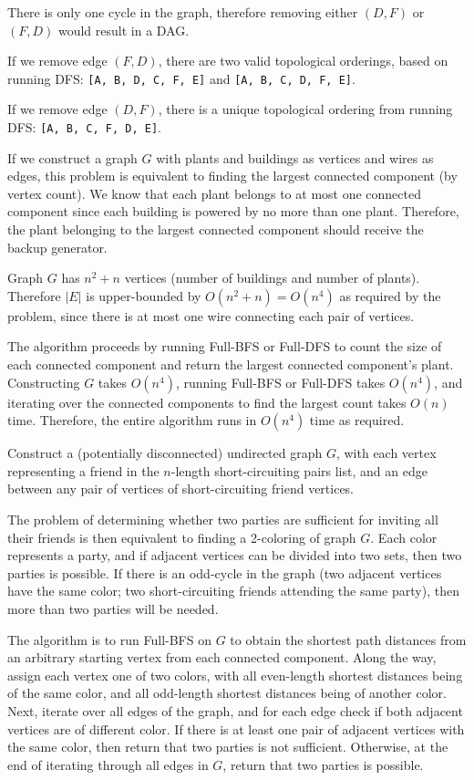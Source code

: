 \documentclass[12pt,twoside]{article}
\begin{document}
\begin{problems}
\begin{problemparts}
\problempart %
There is only one cycle in the graph, therefore removing either $(D, F)$ or $(F, D)$ would result in a DAG.

If we remove edge $(F, D)$, there are two valid topological orderings, based on running DFS: \verb|[A, B, D, C, F, E]| and \verb|[A, B, C, D, F, E]|.

If we remove edge $(D, F)$, there is a unique topological ordering from running DFS: \verb|[A, B, C, F, D, E]|.

\end{problemparts}

\newpage
\problem  %
If we construct a graph $G$ with plants and buildings as vertices and wires as edges, this problem is equivalent to finding the largest connected component (by vertex count). We know that each plant belongs to at most one connected component since each building is powered by no more than one plant. Therefore, the plant belonging to the largest connected component should receive the backup generator.

Graph $G$ has $n^2 + n$ vertices (number of buildings and number of plants). Therefore $|E|$ is upper-bounded by $O(n^2+n)=O(n^4)$ as required by the problem, since there is at most one wire connecting each pair of vertices.

The algorithm proceeds by running Full-BFS or Full-DFS to count the size of each connected component and return the largest connected component's plant. Constructing $G$ takes $O(n^4)$, running Full-BFS or Full-DFS takes $O(n^4)$, and iterating over the connected components to find the largest count takes $O(n)$ time. Therefore, the entire algorithm runs in $O(n^4)$ time as required.

\newpage
\problem  %
Construct a (potentially disconnected) undirected graph $G$, with each vertex representing a friend in the $n$-length short-circuiting pairs list, and an edge between any pair of vertices of short-circuiting friend vertices.

The problem of determining whether two parties are sufficient for inviting all their friends is then equivalent to finding a 2-coloring of graph $G$. Each color represents a party, and if adjacent vertices can be divided into two sets, then two parties is possible. If there is an odd-cycle in the graph (two adjacent vertices have the same color; two short-circuiting friends attending the same party), then more than two parties will be needed.

The algorithm is to run Full-BFS on $G$ to obtain the shortest path distances from an arbitrary starting vertex from each connected component. Along the way, assign each vertex one of two colors, with all even-length shortest distances being of the same color, and all odd-length shortest distances being of another color. Next, iterate over all edges of the graph, and for each edge check if both adjacent vertices are of different color. If there is at least one pair of adjacent vertices with the same color, then return that two parties is not sufficient. Otherwise, at the end of iterating through all edges in $G$, return that two parties is possible.


\end{problems}
\end{document}

